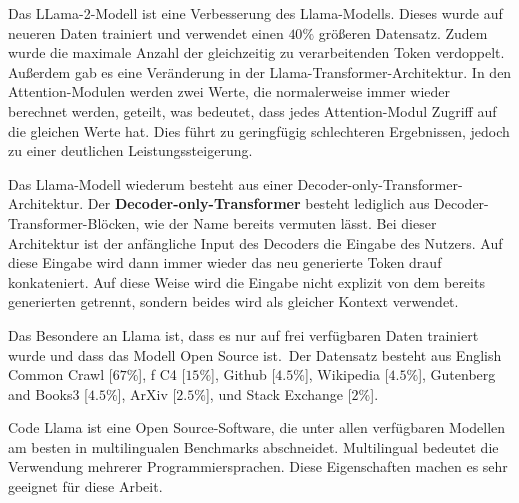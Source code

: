 \documentclass[12pt,letterpaper,ngerman]{article}
\begin{document}
Das LLama-2-Modell ist eine Verbesserung des Llama-Modells.
Dieses wurde auf neueren Daten trainiert und verwendet einen 
$40 \%$ größeren Datensatz. Zudem wurde die maximale Anzahl 
der gleichzeitig zu verarbeitenden Token verdoppelt. Außerdem 
gab es eine Veränderung in der Llama-Transformer-Architektur. 
In den Attention-Modulen werden zwei Werte, die normalerweise 
immer wieder berechnet werden, geteilt, was bedeutet, dass 
jedes Attention-Modul Zugriff auf die gleichen Werte hat.
Dies führt zu geringfügig schlechteren Ergebnissen, jedoch zu
einer deutlichen Leistungssteigerung.

Das Llama-Modell wiederum besteht aus einer Decoder-only-Transformer-Architektur.
Der {\bf Decoder-only-Transformer}
besteht lediglich aus Decoder-Transformer-Blöcken,
wie der Name bereits vermuten lässt. Bei dieser Architektur
ist der anfängliche Input des Decoders die Eingabe des Nutzers.
Auf diese Eingabe wird dann immer wieder das neu generierte Token
drauf konkateniert. Auf diese Weise wird die Eingabe nicht explizit
von dem bereits generierten getrennt, sondern beides wird als 
gleicher Kontext verwendet.

Das Besondere an Llama ist, dass es nur auf frei verfügbaren
Daten trainiert wurde und dass das Modell Open Source ist. Der
Datensatz besteht aus English Common Crawl [$67\%$],
f C4 [$15\%$],  Github [$4.5\%$],
Wikipedia [$4.5\%$], Gutenberg and Books3 [$4.5\%$], 
ArXiv [$2.5\%$], und Stack Exchange [$2\%$].

Code Llama ist eine Open Source-Software, die unter allen 
verfügbaren Modellen am besten in multilingualen Benchmarks 
abschneidet. Multilingual bedeutet die Verwendung mehrerer 
Programmiersprachen. Diese Eigenschaften machen es sehr geeignet
für diese Arbeit.
\end{document}
